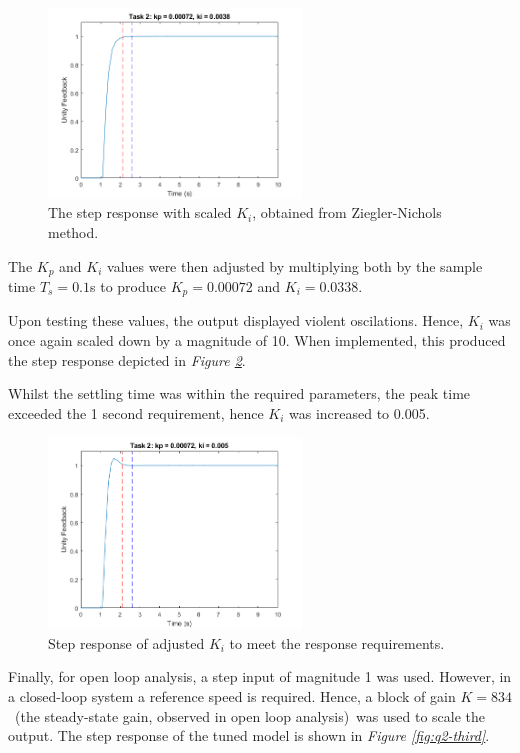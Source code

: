 \documentclass[11pt, onecolumn]{article}
\begin{document}
\begin{figure}[h!]
    \centering
    \includegraphics[width=0.6\textwidth]{q2-g2.png}
    \caption{The step response with scaled $K_i$, obtained from Ziegler-Nichols method.}
    \label{fig:q2-first}
\end{figure}
\par The $K_p$ and $K_i$ values were then adjusted by multiplying both by the sample time $T_s = 0.1$s to produce $K_p = 0.00072$ and $K_i = 0.0338$.
\par Upon testing these values, the output displayed violent oscilations. Hence, $K_i$ was once again scaled down by a magnitude of 10. When implemented, this produced the step response depicted in \textit{Figure \ref{fig:q2-second}}.
\par Whilst the settling time was within the required parameters, the peak time exceeded the 1 second requirement, hence $K_i$ was increased to 0.005.
\begin{figure}[h!]
    \centering
    \includegraphics[width=0.6\textwidth]{q2-g3.png}
    \caption{Step response of adjusted $K_i$ to meet the response requirements.}
    \label{fig:q2-second}
\end{figure}
\par Finally, for open loop analysis, a step input of magnitude 1 was used. However, in a closed-loop system a reference speed is required. Hence, a block of gain $K=834$ (the steady-state gain, observed in open loop analysis) was used to scale the output. The step response of the tuned model is shown in \textit{Figure \ref{fig:q2-third}}.
\end{document}
